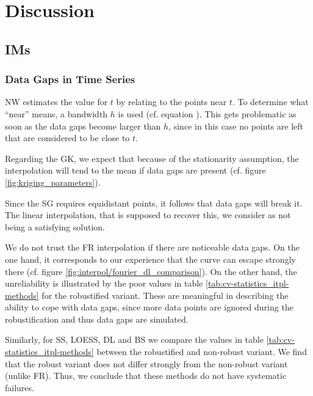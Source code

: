 \chapter{Discussion}\label{sec:discussion}


\section{{{IM}}s}{ \label{sec:discussion_itpl}
    \subsection{Data Gaps in Time Series}\label{sec:discussion_itpl_data_gaps}{
        NW estimates the value for $t$ by relating to the points near $t$. To determine what ``near'' means, a bandwidth $h$ is used (cf. equation ). This gets problematic as soon as the data gaps become larger than $h$, since in this case no points are left that are considered to be close to $t$. 

        Regarding the GK, we expect that because of the stationarity assumption, the interpolation will tend to the mean if data gaps are present (cf. figure \ref{fig:kriging_parameters}). 

        Since the SG requires equidistant points, it follows that data gaps will break it. The linear interpolation, that is supposed to recover this, we consider as not being a satisfying solution.

        We do not trust the FR interpolation if there are noticeable data gaps. On the one hand, it corresponds to our experience that the curve can escape strongly there (cf. figure \ref{fig:interpol/fourier_dl_comparison}). On the other hand, the unreliability is illustrated by the poor values in table \ref{tab:cv-statistics_itpl-methods} for the robustified variant. These are meaningful in describing the ability to cope with data gaps, since more data points are ignored during the robustification and thus data gaps are simulated. 

        Similarly, for SS, LOESS, DL and BS we compare the values in table \ref{tab:cv-statistics_itpl-methods} between the robustified and non-robust variant. We find that the robust variant does not differ strongly from the non-robust variant (unlike FR). Thus, we conclude that these methods do not have systematic failures.

}}
